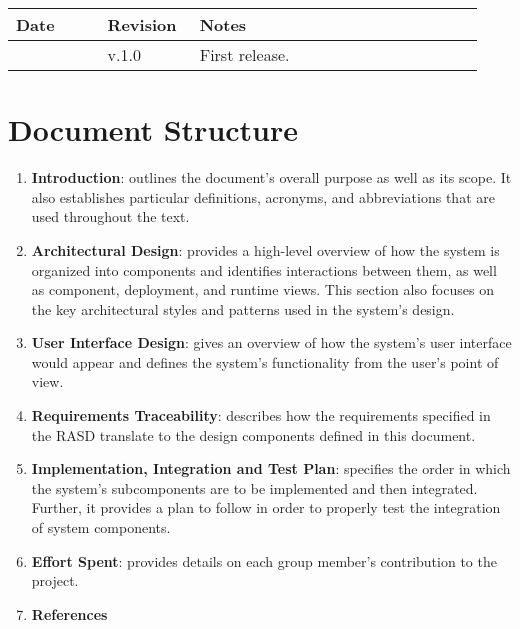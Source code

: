 \begin{center}
	\begin{longtable}{@{}p{0.18\linewidth} p{0.18\linewidth} p{0.57\linewidth}@{}}
		\toprule
		\textbf{Date}   & \textbf{Revision} & \textbf{Notes}\\
		\midrule
        \date{}      & v.1.0             & First release.\\
		\bottomrule
	\end{longtable}
\end{center}

\printbibliography[title={Reference Documents},keyword=intro, heading=subbibnumbered]

\section{Document Structure}

\begin{enumerate}
    \item \textbf{Introduction}: outlines the document's overall purpose as well as its scope. It also establishes particular definitions, acronyms, and abbreviations that are used throughout the text.
    \item \textbf{Architectural Design}: provides a high-level overview of how the system is organized into components and identifies interactions between them, as well as component, deployment, and runtime views. This section also focuses on the key architectural styles and patterns used in the system's design.
    \item \textbf{User Interface Design}: gives an overview of how the system's user interface would appear and defines the system's functionality from the user's point of view.
    \item \textbf{Requirements Traceability}: describes how the requirements specified in the RASD translate to the design components defined in this document.
    \item \textbf{Implementation, Integration and Test Plan}: specifies the order in which the system's subcomponents are to be implemented and then integrated. Further, it provides a plan to follow in order to properly test the integration of system components.
    \item \textbf{Effort Spent}: provides details on each group member's contribution to the project.
    \item \textbf{References}
\end{enumerate}
